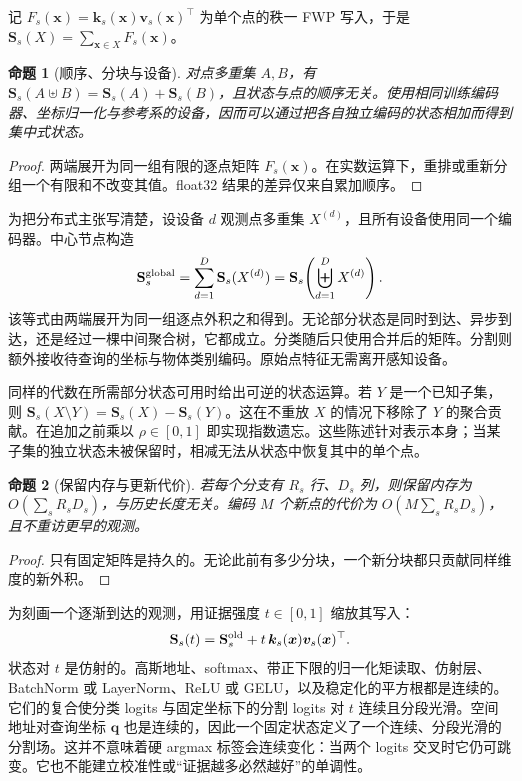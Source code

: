 \documentclass[UTF8,a4paper,11pt,fontset=windows]{ctexart}
\newtheorem{proposition}{命题}
\newcommand{\Sstate}{\mathbf{S}}
\begin{document}
记 $F_s(\bm x)=\bm k_s(\bm x)\bm v_s(\bm x)^\top$ 为单个点的秩一 FWP 写入，于是 $\Sstate_s(X)=\sum_{\bm x\in X}F_s(\bm x)$。

\begin{proposition}[顺序、分块与设备]
\label{prop:order-cn}
对点多重集 $A,B$，有 $\Sstate_s(A\uplus B)=\Sstate_s(A)+\Sstate_s(B)$，且状态与点的顺序无关。使用相同训练编码器、坐标归一化与参考系的设备，因而可以通过把各自独立编码的状态相加而得到集中式状态。
\end{proposition}
\begin{proof}
两端展开为同一组有限的逐点矩阵 $F_s(\bm x)$。在实数运算下，重排或重新分组一个有限和不改变其值。float32 结果的差异仅来自累加顺序。
\end{proof}

为把分布式主张写清楚，设设备 $d$ 观测点多重集 $X^{(d)}$，且所有设备使用同一个编码器。中心节点构造
\begin{equation}
\Sstate_s^{\rm global}=\sum_{d=1}^{D}\Sstate_s(X^{(d)})
=\Sstate_s\!\left(\biguplus_{d=1}^{D}X^{(d)}\right).
\label{eq:distributed-cn}
\end{equation}
该等式由两端展开为同一组逐点外积之和得到。无论部分状态是同时到达、异步到达，还是经过一棵中间聚合树，它都成立。分类随后只使用合并后的矩阵。分割则额外接收待查询的坐标与物体类别编码。原始点特征无需离开感知设备。

同样的代数在所需部分状态可用时给出可逆的状态运算。若 $Y$ 是一个已知子集，则 $\Sstate_s(X\setminus Y)=\Sstate_s(X)-\Sstate_s(Y)$。这在不重放 $X$ 的情况下移除了 $Y$ 的聚合贡献。在追加之前乘以 $\rho\in[0,1]$ 即实现指数遗忘。这些陈述针对表示本身；当某子集的独立状态未被保留时，相减无法从状态中恢复其中的单个点。

\begin{proposition}[保留内存与更新代价]
\label{prop:memory-cn}
若每个分支有 $R_s$ 行、$D_s$ 列，则保留内存为 $O(\sum_sR_sD_s)$，与历史长度无关。编码 $M$ 个新点的代价为 $O(M\sum_sR_sD_s)$，且不重访更早的观测。
\end{proposition}
\begin{proof}
只有固定矩阵是持久的。无论此前有多少分块，一个新分块都只贡献同样维度的新外积。
\end{proof}

为刻画一个逐渐到达的观测，用证据强度 $t\in[0,1]$ 缩放其写入：
\begin{equation}
\Sstate_s(t)=\Sstate_s^{\rm old}+t\,\bm k_s(\bm x)\bm v_s(\bm x)^\top .
\label{eq:continuous-cn}
\end{equation}
状态对 $t$ 是仿射的。高斯地址、softmax、带正下限的归一化矩读取、仿射层、BatchNorm 或 LayerNorm、ReLU 或 GELU，以及稳定化的平方根都是连续的。它们的复合使分类 logits 与固定坐标下的分割 logits 对 $t$ 连续且分段光滑。空间地址对查询坐标 $\bm q$ 也是连续的，因此一个固定状态定义了一个连续、分段光滑的分割场。这并不意味着硬 argmax 标签会连续变化：当两个 logits 交叉时它仍可跳变。它也不能建立校准性或“证据越多必然越好”的单调性。
\end{document}
